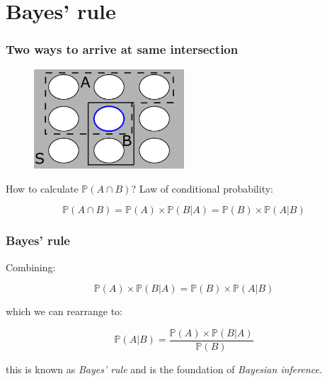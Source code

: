 \documentclass{beamer}
\begin{document}
	\section{Bayes' rule}
	\frame{\tableofcontents[currentsection]}
	
	\begin{frame}
		\frametitle{Two ways to arrive at same intersection}
		
		\begin{figure}[ht]
			\centerline{\includegraphics[width=0.5\textwidth]{./figures/pebble_world_and.png}}
		\end{figure}
		
		How to calculate $\mathbb{P}(A \cap B)$? Law of conditional probability:
		
		\begin{equation}
			\mathbb{P}(A \cap B) = \mathbb{P}(A) \times \mathbb{P}(B|A) = \mathbb{P}(B) \times \mathbb{P}(A|B)
		\end{equation}
		
	\end{frame}
	
	\begin{frame}
		\frametitle{Bayes' rule}
		
		Combining:
		
		\begin{equation}
		\mathbb{P}(A) \times \mathbb{P}(B|A) = \mathbb{P}(B) \times \mathbb{P}(A|B)
		\end{equation}
		
		which we can rearrange to:
		
		\begin{equation}
		\mathbb{P}(A|B) = \frac{\mathbb{P}(A) \times \mathbb{P}(B|A)}{\mathbb{P}(B)}
		\end{equation}
		
		this is known as \textit{Bayes' rule} and is the foundation of \textit{Bayesian inference}.
		
	\end{frame}
	
\end{document}
